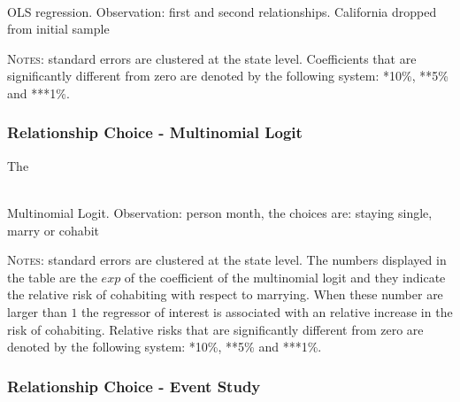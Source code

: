\documentclass[12pt]{article}
\numberwithin{table}{section}
\begin{document}
\begin{table}[H]\centering
	\caption{\\OLS regression. Observation: first and second relationships. California dropped from initial sample}
	\label{table:wmarc_c}
	\begin{threeparttable}[t]\centering
		
		\begin{tablenotes}[flushleft]
			\footnotesize{\item \textsc{Notes}: standard errors are clustered at the state level.
				Coefficients that are significantly different from zero are denoted by the following system: *10\%, **5\%  and ***1\%.}
		\end{tablenotes}
	\end{threeparttable}
\end{table}
\FloatBarrier





\subsubsection*{Relationship Choice - Multinomial Logit}
The
\begin{table}[H]\centering
	\caption{\\Multinomial Logit. Observation: person month, the choices are: staying single, marry or cohabit}
	\label{table:wmar_mlogit}
	\begin{threeparttable}[t]\centering
		
		\begin{tablenotes}[flushleft]
			\footnotesize{\item \textsc{Notes}: standard errors are clustered at the state level. The numbers displayed in the table are the $exp$ of the coefficient of the multinomial logit and they indicate the relative risk of cohabiting with respect to marrying. When these number are larger than $1$ the regressor of interest is associated with an relative increase in the risk of cohabiting.
				Relative risks that are significantly different from zero are denoted by the following system: *10\%, **5\%  and ***1\%.}
		\end{tablenotes}
	\end{threeparttable}
\end{table}
\FloatBarrier
\subsubsection*{Relationship Choice - Event Study}
\end{document}
